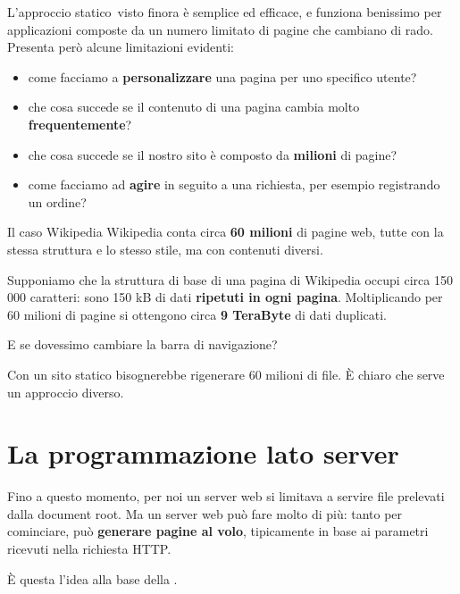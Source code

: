 L'approccio \guillemotleft statico\guillemotright\ visto finora è semplice ed efficace, e funziona
benissimo per applicazioni composte da un numero limitato di pagine che cambiano
di rado. Presenta però alcune limitazioni evidenti:

\begin{itemize}
  \item come facciamo a \textbf{personalizzare} una pagina per uno specifico
        utente?
  \item che cosa succede se il contenuto di una pagina cambia molto
        \textbf{frequentemente}?
  \item che cosa succede se il nostro sito è composto da \textbf{milioni} di
        pagine?
  \item come facciamo ad \textbf{agire} in seguito a una richiesta, per esempio
        registrando un ordine?
\end{itemize}

\begin{esempio}{Il caso Wikipedia}
Wikipedia conta circa \textbf{60 milioni} di pagine web, tutte con la stessa
struttura e lo stesso stile, ma con contenuti diversi.

Supponiamo che la struttura di base di una pagina di Wikipedia occupi circa
150\,000 caratteri: sono 150 kB di dati \textbf{ripetuti in ogni pagina}.
Moltiplicando per 60 milioni di pagine si ottengono circa \textbf{9 TeraByte} di
dati duplicati.

E se dovessimo cambiare la barra di navigazione?

Con un sito statico bisognerebbe rigenerare 60 milioni di file. È chiaro che
serve un approccio diverso.
\end{esempio}

\section{La programmazione lato server}

Fino a questo momento, per noi un server web si limitava a servire file
prelevati dalla document root. Ma un server web può fare molto di più: tanto per
cominciare, può \textbf{generare pagine al volo}, tipicamente in base ai
parametri ricevuti nella richiesta HTTP.

È questa l'idea alla base della .

